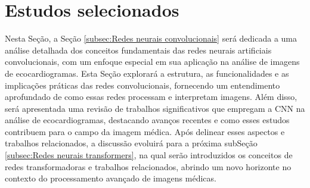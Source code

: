 \begin{table}[!ht]
\begin{center}
\caption{Tabela de artigos selecionados}
\label{tab:trabalhos}
\end{center}
\end{table}

\section{Estudos selecionados}
\label{Estudos selecionados}

Nesta Seção, a Seção \ref{subsec:Redes neurais convolucionais} será dedicada a uma análise detalhada dos conceitos fundamentais das redes neurais artificiais convolucionais, com um enfoque especial em sua aplicação na análise de imagens de ecocardiogramas. Esta Seção explorará a estrutura, as funcionalidades e as implicações práticas das redes convolucionais, fornecendo um entendimento aprofundado de como essas redes processam e interpretam imagens. Além disso, será apresentada uma revisão de trabalhos significativos que empregam a CNN na análise de ecocardiogramas, destacando avanços recentes e como esses estudos contribuem para o campo da imagem médica. Após delinear esses aspectos e trabalhos relacionados, a discussão evoluirá para a próxima subSeção  \ref{subsec:Redes neurais transformers}, na qual serão introduzidos os conceitos de redes transformadoras e trabalhos relacionados, abrindo um novo horizonte no contexto do processamento avançado de imagens médicas. 

